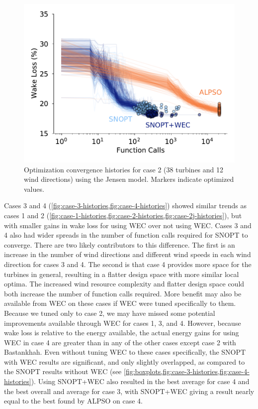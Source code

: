 \documentclass{jpconf}
\begin{document}
\begin{figure}[h!]
\begin{minipage}[t]{0.45\textwidth}
		\includegraphics[width=\textwidth]{final_images/results/convergence_history_JENSENmodel_38turbs_12dirs}  
		\caption{Optimization convergence histories for case 2 (38 turbines and 12 wind directions) using the Jensen model. Markers indicate optimized values.}
		\label{fig:case-2j-histories}
	\end{minipage}
\end{figure}

Cases 3 and 4 (\cref{fig:case-3-histories,fig:case-4-histories}) showed similar trends as cases 1 and 2 (\cref{fig:case-1-histories,fig:case-2-histories,fig:case-2j-histories}), but with smaller gains in wake loss for using WEC over not using WEC. Cases 3 and 4 also had wider spreads in the number of function calls required for SNOPT to converge. There are two likely contributors to this difference. The first is an increase in the number of wind directions and different wind speeds in each wind direction for cases 3 and 4. The second is that case 4 provides more space for the turbines in general, resulting in a flatter design space with more similar local optima. The increased wind resource complexity and flatter design space could both increase the number of function calls required. More benefit may also be available from WEC on these cases if WEC were tuned specifically to them. Because we tuned only to case 2, we may have missed some potential improvements available through WEC for cases 1, 3, and 4. However, because wake loss is relative to the energy available, the actual energy gains for using WEC in case 4 are greater than in any of the other cases except case 2 with Bastankhah.  Even without tuning WEC to these cases specifically, the SNOPT with WEC results are significant, and only slightly overlapped, as compared to the SNOPT results without WEC (see \cref{fig:boxplots,fig:case-3-histories,fig:case-4-histories}). Using SNOPT+WEC also resulted in the best average for case 4 and the best overall and average for case 3, with SNOPT+WEC giving a result nearly equal to the best found by ALPSO on case 4.
\end{document}
